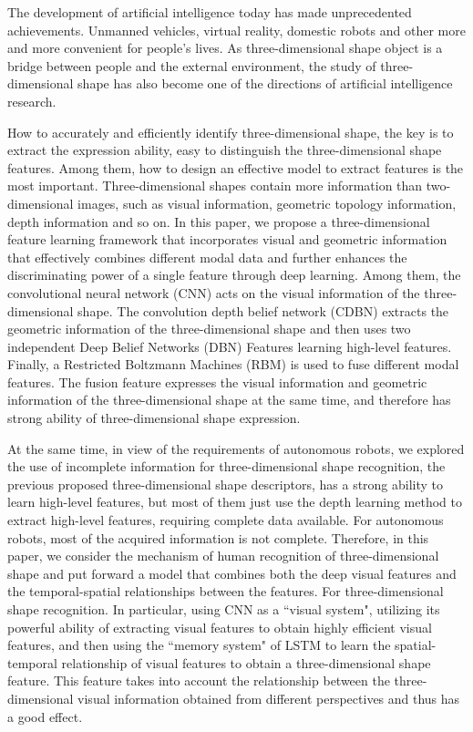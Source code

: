 \begin{Abstract}

The development of artificial intelligence today has made unprecedented achievements. Unmanned vehicles, virtual reality, domestic robots and other more and more convenient for people's lives. As three-dimensional shape object is a bridge between people and the external environment, the study of three-dimensional shape has also become one of the directions of artificial intelligence research.

How to accurately and efficiently identify three-dimensional shape, the key is to extract the expression ability, easy to distinguish the three-dimensional shape features. Among them, how to design an effective model to extract features is the most important. Three-dimensional shapes contain more information than two-dimensional images, such as visual information, geometric topology information, depth information and so on. In this paper, we propose a three-dimensional feature learning framework that incorporates visual and geometric information that effectively combines different modal data and further enhances the discriminating power of a single feature through deep learning. Among them, the convolutional neural network (CNN) acts on the visual information of the three-dimensional shape. The convolution depth belief network (CDBN) extracts the geometric information of the three-dimensional shape and then uses two independent Deep Belief Networks (DBN) Features learning high-level features. Finally, a Restricted Boltzmann Machines (RBM) is used to fuse different modal features. The fusion feature expresses the visual information and geometric information of the three-dimensional shape at the same time, and therefore has strong ability of three-dimensional shape expression.


At the same time, in view of the requirements of autonomous robots, we explored the use of incomplete information for three-dimensional shape recognition, the previous proposed three-dimensional shape descriptors, has a strong ability to learn high-level features, but most of them just use the depth learning method to extract high-level features, requiring complete data available. For autonomous robots, most of the acquired information is not complete. Therefore, in this paper, we consider the mechanism of human recognition of three-dimensional shape and put forward a model that combines both the deep visual features and the temporal-spatial relationships between the features. For three-dimensional shape recognition. In particular, using CNN as a ``visual system", utilizing its powerful ability of extracting visual features to obtain highly efficient visual features, and then using the ``memory system" of LSTM to learn the spatial-temporal relationship of visual features to obtain a three-dimensional shape feature. This feature takes into account the relationship between the three-dimensional visual information obtained from different perspectives and thus has a good effect.


\end{Abstract}

